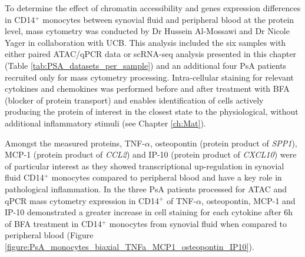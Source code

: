 To determine the effect of chromatin accessibility and genes expression differences in CD14$^+$ monocytes between synovial fluid and peripheral blood at the protein level, mass cytometry was conducted by Dr Hussein Al-Mossawi and Dr Nicole Yager in collaboration with UCB. This analysis included the six samples with either paired ATAC/qPCR data or scRNA-seq analysis presented in this chapter (Table \ref{tab:PSA_datasets_per_sample}) and an additional four PsA patients recruited only for mass cytometry processing. Intra-cellular staining for relevant cytokines and chemokines was performed before and after treatment with BFA (blocker of protein transport) and enables identification of cells actively producing the protein of interest in the closest state to the physiological, without additional inflammatory stimuli (see Chapter \ref{ch:Mat}).

Amongst the measured proteins, TNF-$\alpha$, osteopontin (protein product of \textit{SPP1}), MCP-1 (protein product of \textit{CCL2}) and IP-10 (protein product of \textit{CXCL10}) were of particular interest as they showed transcriptional up-regulation in synovial fluid CD14$^+$ monocytes compared to peripheral blood and have a key role in pathological inflammation. In the three PsA patients processed for ATAC and qPCR mass cytometry expression in CD14$^+$ of TNF-$\alpha$, osteopontin, MCP-1 and IP-10 demonstrated a greater increase in cell staining for each cytokine after 6h of BFA treatment in CD14$^+$ monocytes from synovial fluid when compared to peripheral blood (Figure \ref{figure:PsA_monocytes_biaxial_TNFa_MCP1_osteopontin_IP10}).



